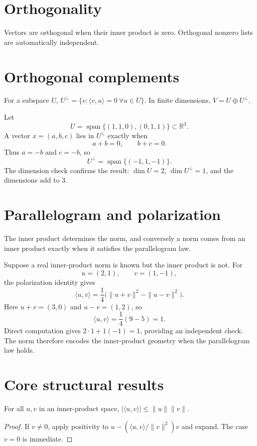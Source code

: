 \section{Orthogonality}
Vectors are orthogonal when their inner product is zero. Orthogonal nonzero lists are automatically independent.

\section{Orthogonal complements}
For a subspace $U$, $U^\perp=\{v:\langle v,u\rangle=0\ \forall u\in U\}$. In finite dimensions, $V=U\oplus U^\perp$.


\begin{example}\label{ex:i13-expand-02}
Let
\[
U=\operatorname{span}\{(1,1,0),(0,1,1)\}\subset\mathbb R^3.
\]
A vector \(x=(a,b,c)\) lies in \(U^\perp\) exactly when
\[
a+b=0,\qquad b+c=0.
\]
Thus \(a=-b\) and \(c=-b\), so
\[
U^\perp=\operatorname{span}\{(-1,1,-1)\}.
\]
The dimension check confirms the result:
\(\dim U=2\), \(\dim U^\perp=1\), and the dimensions add to \(3\).
\end{example}
\section{Parallelogram and polarization}
The inner product determines the norm, and conversely a norm comes from an inner product exactly when it satisfies the parallelogram law.


\begin{example}\label{ex:i13-expand-03}
Suppose a real inner-product norm is known but the inner product is not.
For
\[
u=(2,1),\qquad v=(1,-1),
\]
the polarization identity gives
\[
\langle u,v\rangle
=\frac14\bigl(\|u+v\|^2-\|u-v\|^2\bigr).
\]
Here \(u+v=(3,0)\) and \(u-v=(1,2)\), so
\[
\langle u,v\rangle=\frac14(9-5)=1.
\]
Direct computation gives \(2\cdot1+1(-1)=1\), providing an independent check.
The norm therefore encodes the inner-product geometry when the parallelogram
law holds.
\end{example}
\section{Core structural results}

\begin{theorem}\label{thm:i13-01}
For all $u,v$ in an inner-product space, $|\langle u,v\rangle|\le\|u\|\|v\|$.
\begin{proof}
If $v\ne0$, apply positivity to $u-(\langle u,v\rangle/\|v\|^2)v$ and expand. The case $v=0$ is immediate.
\end{proof}
\end{theorem}

